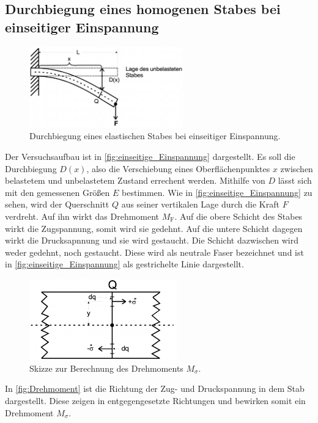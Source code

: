\subsection{Durchbiegung eines homogenen Stabes bei einseitiger Einspannung}
\begin{figure}
    \centering
    \includegraphics[height=3.5cm]{Abbildungen/einseitige_Einspannung.pdf}
    \caption{Durchbiegung eines elastischen Stabes bei einseitiger Einspannung.}
    \label{fig:einseitige_Einspannung}
\end{figure}\noindent
Der Versuchsaufbau ist in \autoref{fig:einseitige_Einspannung} dargestellt.
Es soll die Durchbiegung $D(x)$, also die Verschiebung eines Oberflächenpunktes $x$ zwischen belastetem 
und unbelastetem Zustand errechent werden.
Mithilfe von $D$ lässt sich mit den gemessenen Größen $E$ bestimmen.
Wie in \autoref{fig:einseitige_Einspannung} zu sehen, wird der Querschnitt $Q$ aus seiner vertikalen Lage durch die Kraft $F$ verdreht.
Auf ihn wirkt das Drehmoment $M_\text{F}$.
Auf die obere Schicht des Stabes wirkt die Zugspannung, somit wird sie gedehnt.
Auf die untere Schicht dagegen wirkt die Drucksapnnung und sie wird gestaucht.
Die Schicht dazwischen wird weder gedehnt, noch gestaucht.
Diese wird als neutrale Faser bezeichnet und ist in \autoref{fig:einseitige_Einspannung} als gestrichelte Linie dargestellt.
\begin{figure}
    \centering
    \includegraphics[height=3.5cm]{Abbildungen/Skizze_Drehmoment.pdf}
    \caption{Skizze zur Berechnung des Drehmoments $M_\sigma$.}
    \label{fig:Drehmoment}
\end{figure}
In \autoref{fig:Drehmoment} ist die Richtung der Zug- und Druckspannung in dem Stab dargestellt.
Diese zeigen in entgegengesetzte Richtungen und bewirken somit ein Drehmoment $M_\sigma$.
